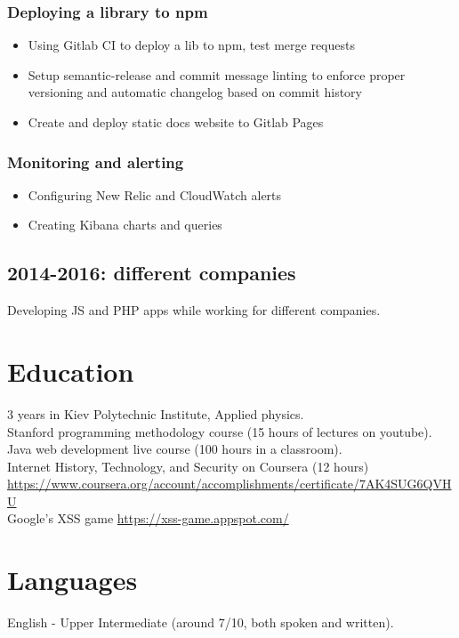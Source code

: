 \documentclass[a4paper, 14pt]{article}
\begin{document}
		\subsubsection{Deploying a library to npm}
			\begin{itemize}
				\item Using Gitlab CI to deploy a lib to npm, test merge requests \\
				\item Setup semantic-release and commit message linting to enforce proper versioning and automatic changelog based on commit history \\
				\item Create and deploy static docs website to Gitlab Pages
			\end{itemize}

		\subsubsection{Monitoring and alerting}
			\begin{itemize}
				\item Configuring New Relic and CloudWatch alerts \\
				\item Creating Kibana charts and queries
			\end{itemize}

  \subsection{2014-2016: different companies}
    Developing JS and PHP apps while working for different companies.

\section{Education}
	3 years in Kiev Polytechnic Institute, Applied physics. \\
	Stanford programming methodology course (15 hours of lectures on youtube). \\
	Java web development live course (100 hours in a classroom). \\
  Internet History, Technology, and Security on Coursera (12 hours) \url{https://www.coursera.org/account/accomplishments/certificate/7AK4SUG6QVHU} \\
  Google's XSS game \url{https://xss-game.appspot.com/}

\section{Languages}
	English - Upper Intermediate (around 7/10, both spoken and written).
\end{document}
